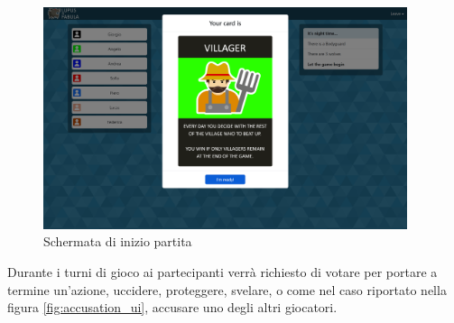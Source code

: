 \begin{figure}[H]
\begin{minipage}{0.25\textwidth}
    \end{minipage}\hfill
    \begin{minipage}{0.75\textwidth}
        \centering
        \includegraphics[width=0.95\textwidth]{img/screen/desktop/card_desktop.png}
    \end{minipage}
    \caption{Schermata di inizio partita}
    \label{fig:card_ui}
\end{figure}

Durante i turni di gioco ai partecipanti verrà richiesto di votare per portare a termine un'azione, uccidere, proteggere, svelare, o come nel caso riportato nella figura \ref{fig:accusation_ui}, accusare uno degli altri giocatori.

